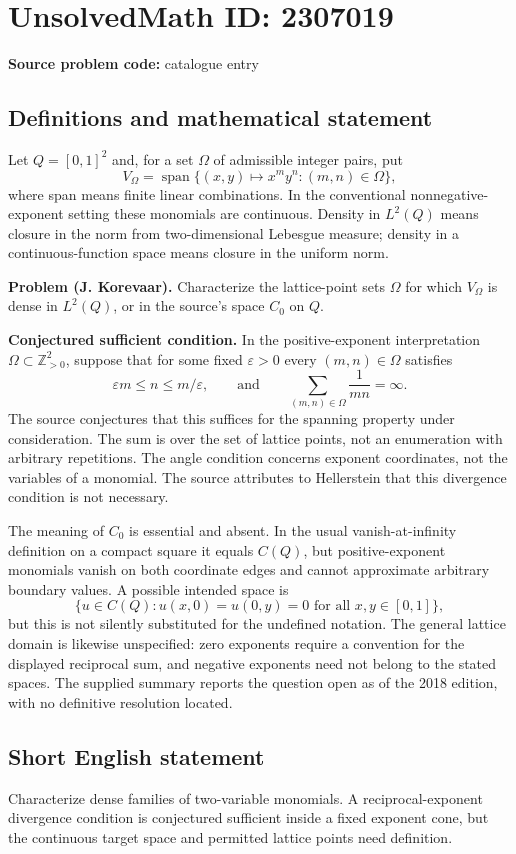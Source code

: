 \documentclass[11pt]{article}
\begin{document}
\section*{UnsolvedMath ID: 2307019}
\textbf{Source problem code:} catalogue entry
\subsection{Definitions and mathematical statement}
Let $Q=[0,1]^2$ and, for a set $\Omega$ of admissible integer pairs, put
\[
V_{\Omega}=\operatorname{span}\{(x,y)\mapsto x^my^n:(m,n)\in\Omega\},
\]
where span means finite linear combinations. In the conventional nonnegative-exponent setting these monomials are continuous. Density in $L^2(Q)$ means closure in the norm from two-dimensional Lebesgue measure; density in a continuous-function space means closure in the uniform norm.

\textbf{Problem (J. Korevaar).} Characterize the lattice-point sets $\Omega$ for which $V_{\Omega}$ is dense in $L^2(Q)$, or in the source's space $C_0$ on $Q$.

\textbf{Conjectured sufficient condition.} In the positive-exponent interpretation $\Omega\subset\mathbb Z_{>0}^2$, suppose that for some fixed $\varepsilon>0$ every $(m,n)\in\Omega$ satisfies
\[
\varepsilon m\leq n\leq m/\varepsilon,
\qquad\text{and}\qquad
\sum_{(m,n)\in\Omega}\frac1{mn}=\infty.
\]
The source conjectures that this suffices for the spanning property under consideration. The sum is over the set of lattice points, not an enumeration with arbitrary repetitions. The angle condition concerns exponent coordinates, not the variables of a monomial. The source attributes to Hellerstein that this divergence condition is not necessary.

The meaning of $C_0$ is essential and absent. In the usual vanish-at-infinity definition on a compact square it equals $C(Q)$, but positive-exponent monomials vanish on both coordinate edges and cannot approximate arbitrary boundary values. A possible intended space is
\[
\{u\in C(Q):u(x,0)=u(0,y)=0\text{ for all }x,y\in[0,1]\},
\]
but this is not silently substituted for the undefined notation. The general lattice domain is likewise unspecified: zero exponents require a convention for the displayed reciprocal sum, and negative exponents need not belong to the stated spaces. The supplied summary reports the question open as of the 2018 edition, with no definitive resolution located.
\subsection{Short English statement}
Characterize dense families of two-variable monomials. A reciprocal-exponent divergence condition is conjectured sufficient inside a fixed exponent cone, but the continuous target space and permitted lattice points need definition.
\end{document}
